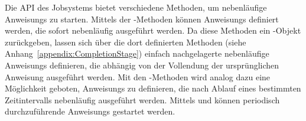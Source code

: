 Die API des Jobsystems bietet verschiedene Methoden, um nebenläufige \glspl{Anweisung} zu starten. Mittels der -Methoden können \glspl{Anweisung} definiert werden, die sofort nebenläufig ausgeführt werden. Da diese Methoden ein -Objekt zurückgeben, lassen sich über die dort definierten Methoden (siehe Anhang~\vref{appendix:CompletionStage}) einfach nachgelagerte nebenläufige \glspl{Anweisung} definieren, die abhängig von der Vollendung der ursprünglichen \gls{Anweisung} ausgeführt werden. Mit den -Methoden wird analog dazu eine Möglichkeit geboten, \glspl{Anweisung} zu definieren, die nach Ablauf eines bestimmten Zeitintervalls nebenläufig ausgeführt werden. Mittels  und  können periodisch durchzuführende \glspl{Anweisung} gestartet werden.